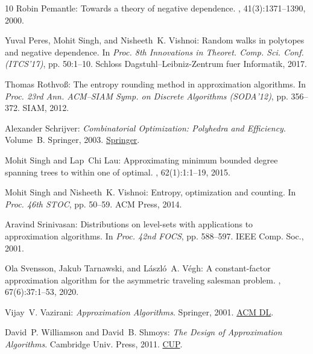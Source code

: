 \documentclass[11pt]{article}
\theoremstyle{definition}
\begin{document}
\begin{thebibliography}{10}
{\sc Robin Pemantle}: Towards a theory of negative dependence.
, 41(3):1371--1390, 2000.
\newblock [\epfmtdoi{10.1063/1.533200}]

{\sc Yuval Peres, Mohit Singh, and Nisheeth~K. Vishnoi}: Random walks in
  polytopes and negative dependence.
\newblock In {\em Proc. 8th Innovations in Theoret. Comp. Sci. Conf.
  (ITCS'17)}, pp. 50:1--10. Schloss Dagstuhl--Leibniz-Zentrum fuer Informatik,
  2017.

{\sc Thomas Rothvo{\ss}}: The entropy rounding method in approximation
  algorithms.
\newblock In {\em Proc. 23rd Ann. ACM--SIAM Symp. on Discrete Algorithms
  (SODA'12)}, pp. 356--372. SIAM, 2012.
\newblock [\epfmtdoi{10.1137/1.9781611973099.32}]

{\sc Alexander Schrijver}: {\em Combinatorial Optimization: Polyhedra and
  Efficiency}.
\newblock Volume~B.
\newblock Springer, 2003.
\newblock \href{https://link.springer.com/book/9783540443896}{Springer}.

{\sc Mohit Singh and Lap~Chi Lau}: Approximating minimum bounded degree
  spanning trees to within one of optimal.
, 62(1):1:1--19, 2015.
\newblock [\epfmtdoi{10.1145/2629366}]

{\sc Mohit Singh and Nisheeth~K. Vishnoi}: Entropy, optimization and counting.
\newblock In {\em Proc. 46th STOC}, pp. 50--59. ACM Press, 2014.
\newblock [\epfmtdoi{10.1145/2591796.2591803}]

{\sc Aravind Srinivasan}: Distributions on level-sets with applications to
  approximation algorithms.
\newblock In {\em Proc. 42nd FOCS}, pp. 588--597. IEEE Comp. Soc., 2001.

{\sc Ola Svensson, Jakub Tarnawski, and L{\'{a}}szl{\'{o}}~A. V{\'{e}}gh}: A
  constant-factor approximation algorithm for the asymmetric traveling salesman
  problem.
, 67(6):37:1--53, 2020.
\newblock [\epfmtdoi{10.1145/3424306}]

{\sc Vijay~V. Vazirani}: {\em Approximation Algorithms}.
\newblock Springer, 2001.
\newblock \href{https://dl.acm.org/doi/book/10.5555/1965254}{ACM DL}.

{\sc David~P. Williamson and David~B. Shmoys}: {\em The Design of Approximation
  Algorithms}.
\newblock Cambridge Univ. Press, 2011.
\newblock \href{https://www.designofapproxalgs.com/}{CUP}.

\end{thebibliography}
\end{document}
